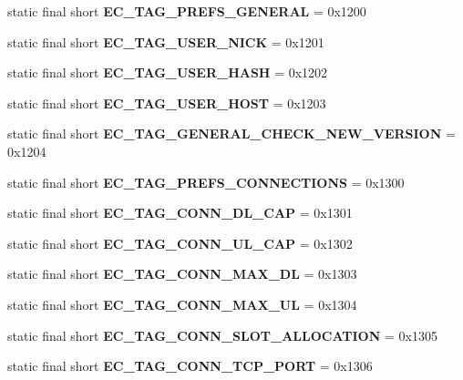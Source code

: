 \begin{DoxyCompactItemize}
\item 
static final short {\bfseries EC\_\-TAG\_\-PREFS\_\-GENERAL} = 0x1200\label{interfaceECCodes_a628262c89d5f927770820b1e2fa58b32}

\item 
static final short {\bfseries EC\_\-TAG\_\-USER\_\-NICK} = 0x1201\label{interfaceECCodes_a2099bf1decf768aac2e4273a767774ee}

\item 
static final short {\bfseries EC\_\-TAG\_\-USER\_\-HASH} = 0x1202\label{interfaceECCodes_a3c3ae93beb8f91c4c4a5dd299b280b81}

\item 
static final short {\bfseries EC\_\-TAG\_\-USER\_\-HOST} = 0x1203\label{interfaceECCodes_a0b93705a8c310acc8d8faf2a506db638}

\item 
static final short {\bfseries EC\_\-TAG\_\-GENERAL\_\-CHECK\_\-NEW\_\-VERSION} = 0x1204\label{interfaceECCodes_ad4c316e400da34db3173c5e2d8d93906}

\item 
static final short {\bfseries EC\_\-TAG\_\-PREFS\_\-CONNECTIONS} = 0x1300\label{interfaceECCodes_affa4d3ebacc43b2fe6ddde73aabb0753}

\item 
static final short {\bfseries EC\_\-TAG\_\-CONN\_\-DL\_\-CAP} = 0x1301\label{interfaceECCodes_a48056782ff7342e243cd3bfccf0c6494}

\item 
static final short {\bfseries EC\_\-TAG\_\-CONN\_\-UL\_\-CAP} = 0x1302\label{interfaceECCodes_a7ea19ec543325a78bacf6f86614cef57}

\item 
static final short {\bfseries EC\_\-TAG\_\-CONN\_\-MAX\_\-DL} = 0x1303\label{interfaceECCodes_acd9d0ee4ea6f46f0cdc1e0fbb179a65a}

\item 
static final short {\bfseries EC\_\-TAG\_\-CONN\_\-MAX\_\-UL} = 0x1304\label{interfaceECCodes_ae0b8a2ff57638e0c7d1670d5b2acc59c}

\item 
static final short {\bfseries EC\_\-TAG\_\-CONN\_\-SLOT\_\-ALLOCATION} = 0x1305\label{interfaceECCodes_a989c6ac5849e2a3ee6b3417792de6350}

\item 
static final short {\bfseries EC\_\-TAG\_\-CONN\_\-TCP\_\-PORT} = 0x1306\label{interfaceECCodes_a29854151bea562def7589e5f5c48be21}


\end{DoxyCompactItemize}
